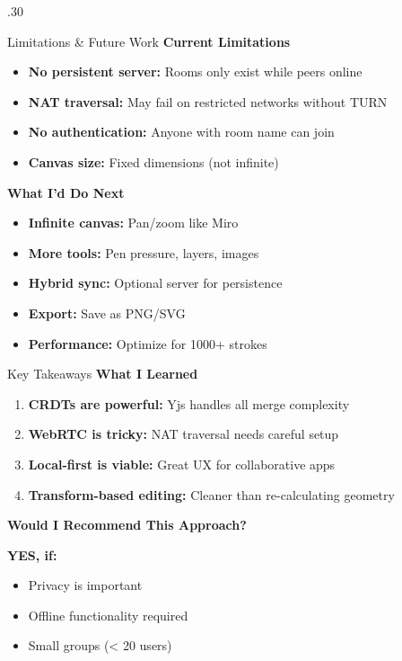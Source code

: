 \documentclass[final,t]{beamer}
\begin{document}
\begin{frame}[t]
\begin{columns}[t]
\begin{column}{.30\linewidth}
\vspace{0.5cm}

\begin{block}{Limitations \& Future Work}
\textbf{Current Limitations}
\begin{itemize}
    \item \textbf{No persistent server:} Rooms only exist while peers online
    \item \textbf{NAT traversal:} May fail on restricted networks without TURN
    \item \textbf{No authentication:} Anyone with room name can join
    \item \textbf{Canvas size:} Fixed dimensions (not infinite)
\end{itemize}

\vspace{0.3cm}
\textbf{What I'd Do Next}
\begin{itemize}
    \item \textbf{Infinite canvas:} Pan/zoom like Miro
    \item \textbf{More tools:} Pen pressure, layers, images
    \item \textbf{Hybrid sync:} Optional server for persistence
    \item \textbf{Export:} Save as PNG/SVG
    \item \textbf{Performance:} Optimize for 1000+ strokes
\end{itemize}
\end{block}

\vspace{0.5cm}

\begin{block}{Key Takeaways}
\textbf{What I Learned}
\begin{enumerate}
    \item \textbf{CRDTs are powerful:} Yjs handles all merge complexity
    \item \textbf{WebRTC is tricky:} NAT traversal needs careful setup
    \item \textbf{Local-first is viable:} Great UX for collaborative apps
    \item \textbf{Transform-based editing:} Cleaner than re-calculating geometry
\end{enumerate}

\vspace{0.3cm}
\textbf{Would I Recommend This Approach?}

\colorbox{success!20}{
\parbox{0.95\linewidth}{
\textbf{YES, if:}
\begin{itemize}
    \item Privacy is important
    \item Offline functionality required
    \item Small groups (< 20 users)
\end{itemize}
}
}


\end{block}
\end{column}
\end{columns}
\end{frame}
\end{document}
